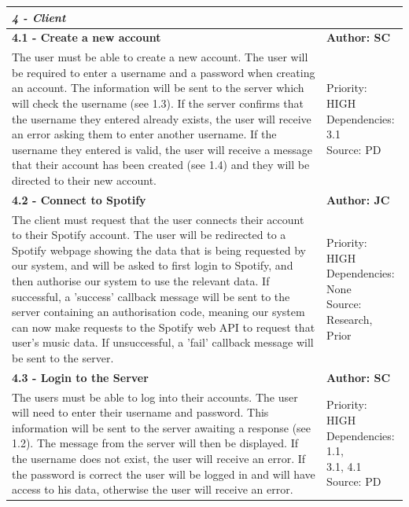 \documentclass[10pt]{report}
\begin{document}
\begin{center}
\begin{longtable}{| p{13cm} | p{3cm} |}
\multicolumn{2}{|l|}{\textbf{\textit{4 - Client}}} \\
\hline
\textbf{4.1 - Create a new account} & \textbf{Author: SC} \\
\hline
The user must be able to create a new account. The user will be required to enter a username and a password when creating an account. The information will be sent to the server which will check the username (see 1.3). If the server confirms that the username they entered already exists, the user will receive an error asking them to enter another username. If the username they entered is valid, the user will receive a message that their account has been created (see 1.4) and they will be directed to their new account. & 
\makecell{Priority: HIGH\\Dependencies: 3.1\\Source: PD} \\
\hline
\textbf{4.2 - Connect to Spotify} & \textbf{Author: JC} \\
\hline
The client must request that the user connects their account to their Spotify account. The user will be redirected to a Spotify webpage showing the data that is being requested by our system, and will be asked to first login to Spotify, and then authorise our system to use the relevant data. If successful, a 'success' callback message will be sent to the server containing an authorisation code, meaning our system can now make requests to the Spotify web API to request that user's music data. If unsuccessful, a 'fail' callback message will be sent to the server.& 
\makecell{Priority: HIGH\\Dependencies: None\\Source: Research,\\Prior} \\
\hline
\textbf{4.3 - Login to the Server} & \textbf{Author: SC} \\
\hline
The users must be able to log into their accounts. The user will need to enter their username and password. This information will be sent to the server awaiting a response (see 1.2). The message from the server will then be displayed. If the username does not exist, the user will receive an error. If the password is correct the user will be logged in and will have access to his data, otherwise the user will receive an error. &
\makecell{Priority: HIGH\\Dependencies: 1.1,\\ 3.1, 4.1\\Source: PD}\\

\end{longtable}
\end{center}
\end{document}
